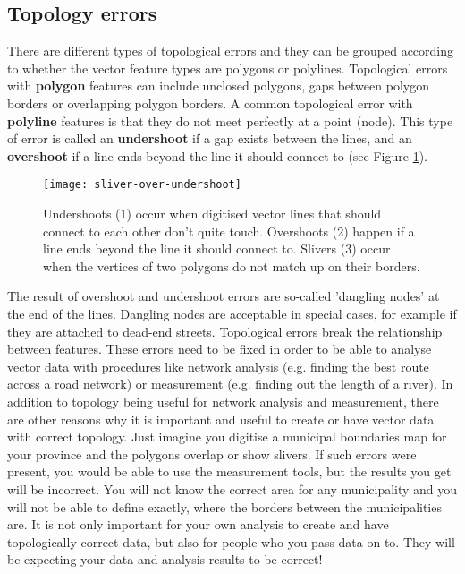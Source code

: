 \subsection{Topology errors}

There are different types of topological errors and they can be grouped
according to whether the vector feature types are polygons or polylines.
Topological errors with \textbf{polygon} features can include unclosed
polygons, gaps
between polygon borders or overlapping polygon borders. A common topological
error with \textbf{polyline} features is that they do not meet perfectly at a
point (node). This type of error is called an \textbf{undershoot} if a gap
exists between the lines, and an \textbf{overshoot} if a line ends beyond the
line it should connect to (see Figure \ref{fig:underovershoot}).  

\begin{figure}[ht]
   \begin{center}
   \caption{Undershoots (1) occur when digitised vector lines that should
connect to each other don't quite touch. Overshoots (2) happen if a line ends
beyond the line it should connect to. Slivers (3) occur when the vertices of
two polygons do not match up on their borders.}
\label{fig:underovershoot}\smallskip
   \texttt{[image: sliver-over-undershoot]}
\end{center}
\end{figure}

The result of overshoot and undershoot errors are so-called 'dangling nodes'
at the end of the lines. Dangling nodes are acceptable in special cases, for
example if they are attached to dead-end streets. 
Topological errors break the relationship between features. These errors need
to be fixed in order to be able to analyse vector data with procedures like
network analysis (e.g. finding the best route across a road network)  or
measurement (e.g. finding out the length of a river). In addition to topology
being useful for network analysis and measurement, there are other reasons
why it is important and useful to create or have vector data with correct
topology. Just imagine you digitise a municipal boundaries map for your
province and the polygons overlap or show slivers. If such errors were
present, you would be able to use the measurement tools, but the results you
get will be incorrect. You will not know the correct area for any
municipality and you will not be able to define exactly, where the borders
between the municipalities are. 
It is not only important for your own analysis to create and have
topologically correct data, but also for people who you pass data on to. They
will be expecting your data and analysis results to be correct!

